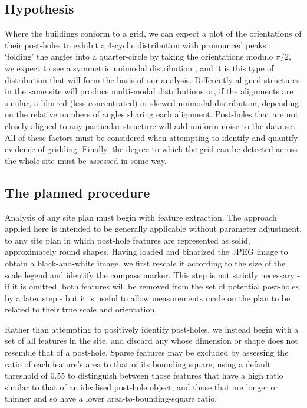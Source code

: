 \documentclass[../../ArchStats.tex]{subfiles}
\begin{document}
\subsection{Hypothesis}
Where the buildings conform to a grid, %
we can expect a plot of the orientations of their post-holes to exhibit a 4-cyclic distribution with pronounced peaks%
; `folding' the angles into a quarter-circle by taking the orientations modulo $\pi/2$, we expect to see a symmetric unimodal distribution%
, and it is this type of distribution that will form the basis of our analysis. Differently-aligned structures in the same site will produce multi-modal distributions or, if the alignments are similar, a blurred (less-concentrated) or skewed unimodal distribution, depending on the relative numbers of angles sharing each alignment. Post-holes that are not closely aligned to any particular structure will add uniform noise to the data set. All of these factors must be considered when attempting to identify and quantify evidence of gridding. Finally, the degree to which the grid can be detected across the whole site must be assessed in some way.




\subsection{The planned procedure}

Analysis of any site plan must begin with feature extraction. The approach applied here is intended to be generally applicable without parameter adjustment, to any site plan in which post-hole features are represented as solid, approximately round shapes. Having loaded and binarized the JPEG image to obtain a black-and-white image, we first rescale it according to the size of the scale legend and identify the compass marker. This step is not strictly necessary - if it is omitted, both features will be removed from the set of potential post-holes by a later step - but it is useful to allow measurements made on the plan to be related to their true scale and orientation. 

Rather than attempting to positively identify post-holes, we instead begin with a set of all features in the site, and discard any whose dimension or shape does not resemble that of a  post-hole. 
Sparse features may be excluded by assessing the ratio of each feature's area to that of its bounding square, using a default threshold of 0.55 to distinguish between those features that have a high ratio similar to that of an idealised post-hole object, and those   that are  longer or thinner and so have a lower area-to-bounding-square ratio. 
\end{document}
